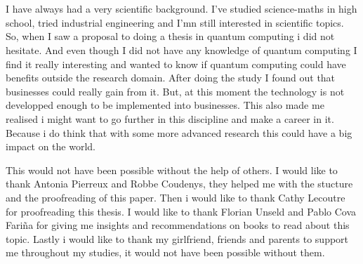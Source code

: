 
\chapter*{}
\label{ch:voorwoord}


I have always had a very scientific background. I've studied science-maths in high school, tried industrial engineering and I'mn still interested in scientific topics.
So, when I saw a proposal to doing a thesis in quantum computing i did not hesitate.
And even though I did not have any knowledge of quantum computing I find it really interesting and wanted to know if quantum computing could have benefits outside the research domain.
After doing the study I found out that businesses could really gain from it. But, at this moment the technology is not developped enough to be implemented into businesses.
This also made me realised i might want to go further in this discipline and make a career in it. Because i do think that with some more advanced research this could have a big impact on the world.


This would not have been possible without the help of others.
I would like to thank Antonia Pierreux and Robbe Coudenys, they helped me with the stucture and the proofreading of this paper.
Then i would like to thank Cathy Lecoutre for proofreading this thesis.
I would like to thank Florian Unseld and Pablo Cova Fariña for giving me insights and recommendations on books to read about this topic.
Lastly i would like to thank my girlfriend, friends and parents to support me throughout my studies, it would not have been possible without them.
